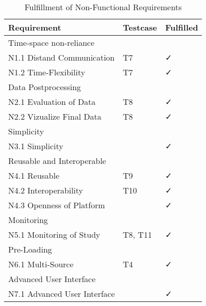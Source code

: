 \begin{table}
    \centering
    \small
    \begin{tabular}{L{0.35\textwidth}C{0.19\textwidth}C{0.19\textwidth}}
    \hline
Requirement                             & Testcase & Fulfilled  \\ \hline
    Time-space non-reliance     &   &          \\ \hline
    N1.1 Distand Communication      & T7 & \faCheck           \\
    N1.2 Time-Flexibility           & T7 & \faCheck            \\ \hline
    Data Postprocessing &      &       \\ \hline
    N2.1 Evaluation of Data         &  T8 &   \faCheck          \\
    N2.2 Vizualize Final Data       & T8 &  \faCheck         \\ \hline
    Simplicity                  &    &        \\ \hline
    N3.1 Simplicity                 &  &  \faCheck      \\\hline
    Reusable and Interoperable  &       &      \\ \hline
    N4.1 Reusable                   & T9 &  \faCheck         \\
    N4.2 Interoperability           & T10 &  \faCheck        \\
    N4.3 Openness of Platform       & &  \faCheck \\\hline
    Monitoring                  &  &           \\ \hline
    N5.1 Monitoring of Study        & T8, T11 &  \faCheck         \\ \hline
    Pre-Loading                 &     &        \\ \hline
    N6.1 Multi-Source             & T4 &  \faCheck          \\ \hline
    Advanced User Interface   &    &         \\ \hline
    N7.1 Advanced User Interface  & & \faCheck         \\ \hline
    \end{tabular}
    \caption[Fulfillment of Non-Functional Requirements]{Fulfillment of Non-Functional Requirements}\label{tab:NonFuncRequirementsCatCheck}
    \end{table}

